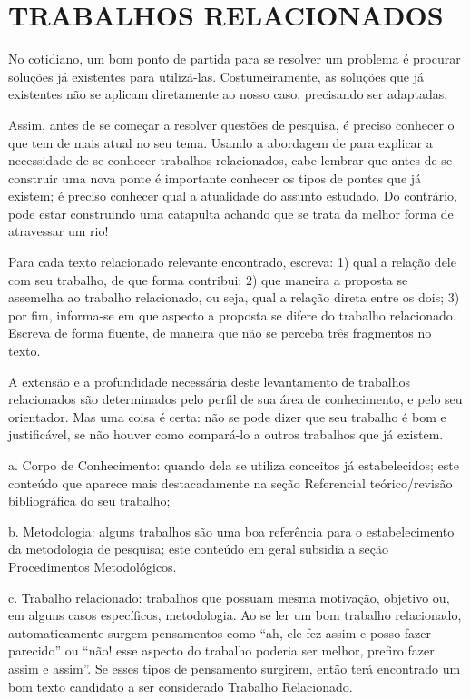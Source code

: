 \section{TRABALHOS RELACIONADOS}

No cotidiano, um bom ponto de partida para se resolver um problema é procurar soluções já existentes para utilizá-las. Costumeiramente, as soluções que já existentes não se aplicam diretamente ao nosso caso, precisando ser adaptadas.

Assim, antes de se começar a resolver questões de pesquisa, é preciso conhecer o que tem de mais atual no seu tema.  Usando a abordagem de  para explicar a necessidade de se conhecer trabalhos relacionados, cabe lembrar que antes de se construir uma nova ponte é importante conhecer os tipos de pontes que já existem; é preciso conhecer qual a atualidade do assunto estudado. Do contrário, pode estar construindo uma catapulta achando que se trata da melhor forma de atravessar um rio!

Para cada texto relacionado relevante encontrado, escreva: 1) qual a relação dele com seu trabalho, de que forma contribui; 2) que maneira a proposta se assemelha ao trabalho relacionado, ou seja, qual a relação direta entre os dois; 3) por fim, informa-se em que aspecto a proposta se difere do trabalho relacionado. Escreva de forma fluente, de maneira que não se perceba três fragmentos no texto.

A extensão e a profundidade necessária deste levantamento de trabalhos relacionados são determinados pelo perfil de sua área de conhecimento, e pelo seu orientador. Mas uma coisa é certa: não se pode dizer que seu trabalho é bom e justificável, se não houver como compará-lo a outros trabalhos que já existem.

\begin{alineas}

\item[a.] Corpo de Conhecimento: quando dela se utiliza conceitos já estabelecidos; este conteúdo que aparece mais destacadamente na seção Referencial teórico/revisão bibliográfica do seu trabalho;

\item[b.] Metodologia: alguns trabalhos são uma boa referência para o estabelecimento da metodologia de pesquisa; este conteúdo em geral subsidia a seção Procedimentos Metodológicos.

\item[c.] Trabalho relacionado: trabalhos que possuam mesma motivação, objetivo ou, em alguns casos específicos, metodologia. Ao se ler um bom trabalho relacionado, automaticamente surgem pensamentos como “ah, ele fez assim e posso fazer parecido” ou “não! esse aspecto do trabalho poderia ser melhor, prefiro fazer assim e assim”.  Se esses tipos de pensamento surgirem, então terá encontrado um bom texto candidato a ser considerado Trabalho Relacionado.

\end{alineas}

